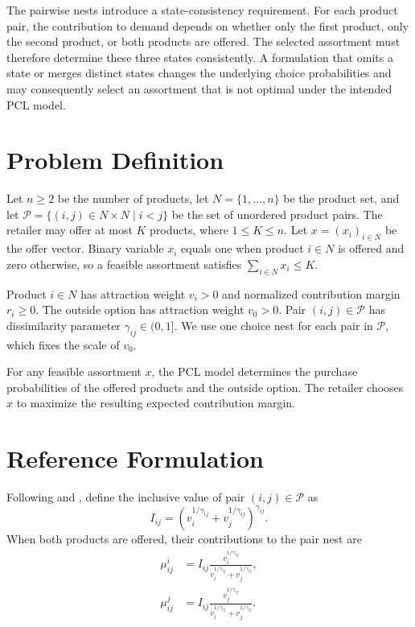 \documentclass[10pt]{article}
\begin{document}
The pairwise nests introduce a state-consistency requirement. For each product pair, the contribution to demand depends on whether only the first product, only the second product, or both products are offered. The selected assortment must therefore determine these three states consistently. A formulation that omits a state or merges distinct states changes the underlying choice probabilities and may consequently select an assortment that is not optimal under the intended PCL model.

\section{Problem Definition}

Let $n\ge2$ be the number of products, let $N=\{1,\ldots,n\}$ be the product set, and let $\mathcal P=\{(i,j)\in N\times N\mid i<j\}$ be the set of unordered product pairs. The retailer may offer at most $K$ products, where $1\le K\le n$. Let $x=(x_i)_{i\in N}$ be the offer vector. Binary variable $x_i$ equals one when product $i\in N$ is offered and zero otherwise, so a feasible assortment satisfies $\sum_{i\in N}x_i\le K$.

Product $i\in N$ has attraction weight $v_i>0$ and normalized contribution margin $r_i\ge0$. The outside option has attraction weight $v_0>0$. Pair $(i,j)\in\mathcal P$ has dissimilarity parameter $\gamma_{ij}\in(0,1]$. We use one choice nest for each pair in $\mathcal P$, which fixes the scale of $v_0$.

For any feasible assortment $x$, the PCL model determines the purchase probabilities of the offered products and the outside option. The retailer chooses $x$ to maximize the resulting expected contribution margin.

\section{Reference Formulation}

Following \citet{koppelman2000} and \citet{zhang2020}, define the inclusive value of pair $(i,j)\in\mathcal P$ as
\begin{equation}
I_{ij}
=
\left(
v_i^{1/\gamma_{ij}}+v_j^{1/\gamma_{ij}}
\right)^{\gamma_{ij}}.
\label{eq:nest}
\end{equation}
When both products are offered, their contributions to the pair nest are
\begin{align}
\mu_{ij}^i
&=
I_{ij}
\frac{v_i^{1/\gamma_{ij}}}
{v_i^{1/\gamma_{ij}}+v_j^{1/\gamma_{ij}}},
\label{eq:massI}\\
\mu_{ij}^j
&=
I_{ij}
\frac{v_j^{1/\gamma_{ij}}}
{v_i^{1/\gamma_{ij}}+v_j^{1/\gamma_{ij}}}.
\label{eq:massJ}
\end{align}
\end{document}

